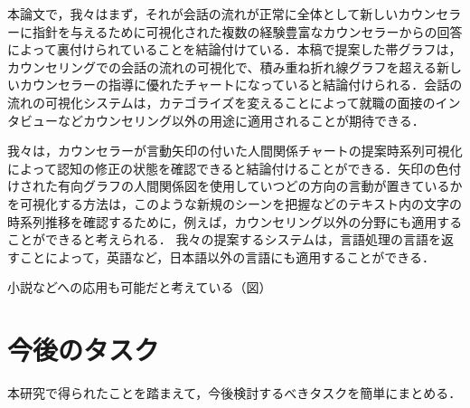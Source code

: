 \documentclass[shuuron]{kuee}
\begin{document}



本論文で，我々はまず，それが会話の流れが正常に全体として新しいカウンセラーに指針を与えるために可視化された複数の経験豊富なカウンセラーからの回答によって裏付けられていることを結論付けている．本稿で提案した帯グラフは，カウンセリングでの会話の流れの可視化で、積み重ね折れ線グラフを超える新しいカウンセラーの指導に優れたチャートになっていると結論付けられる．会話の流れの可視化システムは，カテゴライズを変えることによって就職の面接のインタビューなどカウンセリング以外の用途に適用されることが期待できる．


  我々は，カウンセラーが言動矢印の付いた人間関係チャートの提案時系列可視化によって認知の修正の状態を確認できると結論付けることができる．矢印の色付けされた有向グラフの人間関係図を使用していつどの方向の言動が置きているかを可視化する方法は，このような新規のシーンを把握などのテキスト内の文字の時系列推移を確認するために，例えば，カウンセリング以外の分野にも適用することができると考えられる．
    我々の提案するシステムは，言語処理の言語を返すことによって，英語など，日本語以外の言語にも適用することができる．

小説などへの応用も可能だと考えている（図）

\section{今後のタスク}

本研究で得られたことを踏まえて，今後検討するべきタスクを簡単にまとめる．
\end{document}
